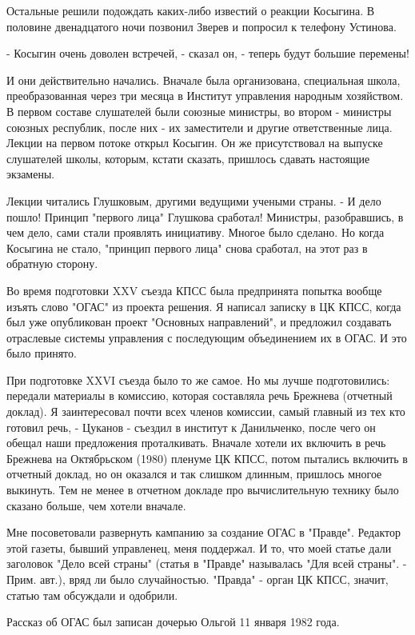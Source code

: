Остальные решили подождать каких-либо известий о реакции Косыгина. В половине
двенадцатого ночи позвонил Зверев и попросил к телефону Устинова.

- Косыгин очень доволен встречей, - сказал он, - теперь будут большие перемены!

И они действительно начались. Вначале была организована, специальная школа,
преобразованная через три месяца в Институт управления народным хозяйством. В
первом составе слушателей были союзные министры, во втором - министры союзных
республик, после них - их заместители и другие ответственные лица. Лекции на
первом потоке открыл Косыгин. Он же присутствовал на выпуске слушателей школы,
которым, кстати сказать, пришлось сдавать настоящие экзамены.

Лекции читались Глушковым, другими ведущими учеными страны. - И дело пошло!
Принцип "первого лица" Глушкова сработал! Министры, разобравшись, в чем дело,
сами стали проявлять инициативу. Многое было сделано. Но когда Косыгина не
стало, "принцип первого лица" снова сработал, на этот раз в обратную сторону.

Во время подготовки XXV съезда КПСС была предпринята попытка вообще изъять слово
"ОГАС" из проекта решения. Я написал записку в ЦК КПСС, когда был уже
опубликован проект "Основных направлений", и предложил создавать отраслевые
системы управления с последующим объединением их в ОГАС. И это было принято.

При подготовке XXVI съезда было то же самое. Но мы лучше подготовились:
передали материалы в комиссию, которая составляла речь Брежнева (отчетный
доклад). Я заинтересовал почти всех членов комиссии, самый главный из тех кто
готовил речь, - Цуканов - съездил в институт к Данильченко, после чего он обещал
наши предложения проталкивать. Вначале хотели их включить в речь Брежнева на
Октябрьском (1980) пленуме ЦК КПСС, потом пытались включить в отчетный доклад,
но он оказался и так слишком длинным, пришлось многое выкинуть. Тем не менее в
отчетном докладе про вычислительную технику было сказано больше, чем хотели
вначале.

Мне посоветовали развернуть кампанию за создание ОГАС в "Правде". Редактор этой
газеты, бывший управленец, меня поддержал. И то, что моей статье дали заголовок
"Дело всей страны" (статья в "Правде" называлась "Для всей страны". - Прим.
авт.), вряд ли было случайностью. "Правда" - орган ЦК КПСС, значит, статью там
обсуждали и одобрили.

Рассказ об ОГАС был записан дочерью Ольгой 11 января 1982 года.

